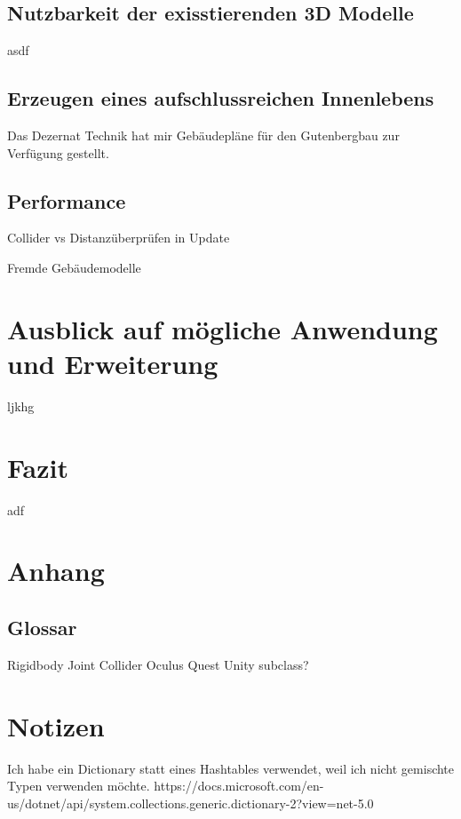 \documentclass[11pt]{article} %
\begin{document}
\subsection{Nutzbarkeit der exisstierenden 3D Modelle}

asdf

\subsection{Erzeugen eines aufschlussreichen Innenlebens}

Das Dezernat Technik hat mir Gebäudepläne für den Gutenbergbau zur Verfügung gestellt.

\subsection{Performance}

Collider vs Distanzüberprüfen in Update

Fremde Gebäudemodelle




\section{Ausblick auf mögliche Anwendung und Erweiterung}

ljkhg




\section {Fazit}

adf




\section {Anhang}

\subsection{Glossar}

Rigidbody
Joint
Collider
Oculus
Quest
Unity
subclass?

\section{Notizen}

Ich habe ein Dictionary statt eines Hashtables verwendet, weil ich nicht gemischte Typen verwenden möchte. 
https://docs.microsoft.com/en-us/dotnet/api/system.collections.generic.dictionary-2?view=net-5.0
\end{document}
